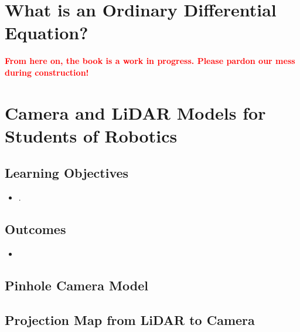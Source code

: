 \documentclass[letterpaper]{book}
\begin{document}
\chapter{What is an Ordinary Differential Equation?}
\label{chap:ODE}


\newpage
\vspace*{6cm}

\begin{center}
{\Huge \textcolor{red}{\bf From here on, the book is a work in progress. Please pardon our mess during construction!}}
\end{center}

\newpage

\chapter{Camera and LiDAR Models for Students of Robotics}
\label{chap:Senors}

\section*{Learning Objectives}
\begin{itemize}
\item {}. 
\end{itemize}

\section*{Outcomes}
\begin{itemize}
\item {}
\end{itemize}


\vspace*{1.5cm}


\newpage


\section{Pinhole Camera Model}
\label{chap:Camera}



\section{Projection Map from LiDAR to Camera}
\label{chap:ProjectionMap}

\end{document}
